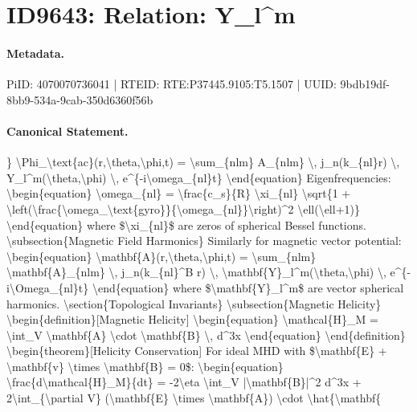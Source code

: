 \section*{ID9643: Relation: Y\_l\textasciicircum{}m}
\paragraph{Metadata.}
PiID: 4070070736041 | RTEID: RTE:P37445.9105:T5.1507 | UUID: 9bdb19df-8bb9-534a-9cab-350d6360f56b

\paragraph{Canonical Statement.}
\} \textbackslash{}Phi\_\textbackslash{}text\{ac\}(r,\textbackslash{}theta,\textbackslash{}phi,t) = \textbackslash{}sum\_\{nlm\} A\_\{nlm\} \textbackslash{}, j\_n(k\_\{nl\}r) \textbackslash{}, Y\_l\textasciicircum{}m(\textbackslash{}theta,\textbackslash{}phi) \textbackslash{}, e\textasciicircum{}\{-i\textbackslash{}omega\_\{nl\}t\} \textbackslash{}end\{equation\} Eigenfrequencies: \textbackslash{}begin\{equation\} \textbackslash{}omega\_\{nl\} = \textbackslash{}frac\{c\_s\}\{R\} \textbackslash{}xi\_\{nl\} \textbackslash{}sqrt\{1 + \textbackslash{}left(\textbackslash{}frac\{\textbackslash{}omega\_\textbackslash{}text\{gyro\}\}\{\textbackslash{}omega\_\{nl\}\}\textbackslash{}right)\textasciicircum{}2 \textbackslash{}ell(\textbackslash{}ell+1)\} \textbackslash{}end\{equation\} where \$\textbackslash{}xi\_\{nl\}\$ are zeros of spherical Bessel functions. \textbackslash{}subsection\{Magnetic Field Harmonics\} Similarly for magnetic vector potential: \textbackslash{}begin\{equation\} \textbackslash{}mathbf\{A\}(r,\textbackslash{}theta,\textbackslash{}phi,t) = \textbackslash{}sum\_\{nlm\} \textbackslash{}mathbf\{A\}\_\{nlm\} \textbackslash{}, j\_n(k\_\{nl\}\textasciicircum{}B r) \textbackslash{}, \textbackslash{}mathbf\{Y\}\_l\textasciicircum{}m(\textbackslash{}theta,\textbackslash{}phi) \textbackslash{}, e\textasciicircum{}\{-i\textbackslash{}Omega\_\{nl\}t\} \textbackslash{}end\{equation\} where \$\textbackslash{}mathbf\{Y\}\_l\textasciicircum{}m\$ are vector spherical harmonics. \textbackslash{}section\{Topological Invariants\} \textbackslash{}subsection\{Magnetic Helicity\} \textbackslash{}begin\{definition\}[Magnetic Helicity] \textbackslash{}begin\{equation\} \textbackslash{}mathcal\{H\}\_M = \textbackslash{}int\_V \textbackslash{}mathbf\{A\} \textbackslash{}cdot \textbackslash{}mathbf\{B\} \textbackslash{}, d\textasciicircum{}3x \textbackslash{}end\{equation\} \textbackslash{}end\{definition\} \textbackslash{}begin\{theorem\}[Helicity Conservation] For ideal MHD with \$\textbackslash{}mathbf\{E\} + \textbackslash{}mathbf\{v\} \textbackslash{}times \textbackslash{}mathbf\{B\} = 0\$: \textbackslash{}begin\{equation\} \textbackslash{}frac\{d\textbackslash{}mathcal\{H\}\_M\}\{dt\} = -2\textbackslash{}eta \textbackslash{}int\_V |\textbackslash{}mathbf\{B\}|\textasciicircum{}2 d\textasciicircum{}3x + 2\textbackslash{}int\_\{\textbackslash{}partial V\} (\textbackslash{}mathbf\{E\} \textbackslash{}times \textbackslash{}mathbf\{A\}) \textbackslash{}cdot \textbackslash{}hat\{\textbackslash{}mathbf\{

